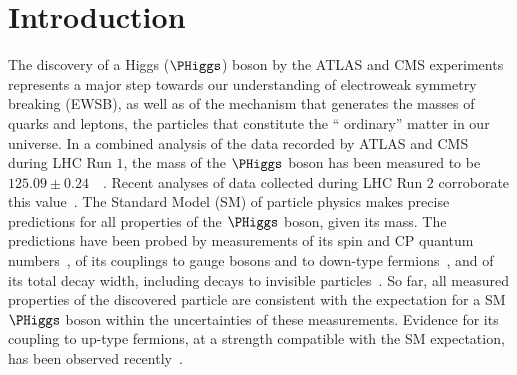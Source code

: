 \section{Introduction}
\label{sec:introduction}

The discovery of a Higgs ($\PHiggs$) boson by the ATLAS and CMS experiments~\cite{Higgs-Discovery_ATLAS,Higgs-Discovery_CMS}
represents a major step towards our understanding of electroweak symmetry breaking (EWSB),
as well as of the mechanism that generates the masses of quarks and leptons, 
the particles that constitute the `` ordinary'' matter in our universe.
In a combined analysis of the data recorded by ATLAS and CMS during LHC Run $1$, 
the mass of the $\PHiggs$ boson has been measured to be $125.09 \pm 0.24$~\GeV~\cite{HIG-14-042}.
Recent analyses of data collected during LHC Run $2$ corroborate this value~\cite{HIG-16-041,Aaboud:2018wps}.
The Standard Model (SM) of particle physics makes precise predictions for all properties of the $\PHiggs$ boson, given its mass. 
The predictions have been probed by measurements of its spin and CP quantum numbers~\cite{HIG-14-018,Aad:2015mxa,Aad:2016nal},
of its couplings to gauge bosons and to down-type fermions~\cite{HIG-15-002},
and of its total decay width, including decays to invisible particles~\cite{HIG-13-030,HIG-14-032,Aad:2015pla}.
So far, all measured properties of the discovered particle are consistent with the expectation for a SM $\PHiggs$ boson 
within the uncertainties of these measurements.
Evidence for its coupling to up-type fermions, at a strength compatible with the SM expectation, has been observed recently~\cite{Aaboud:2018urx,HIG-17-035}.

